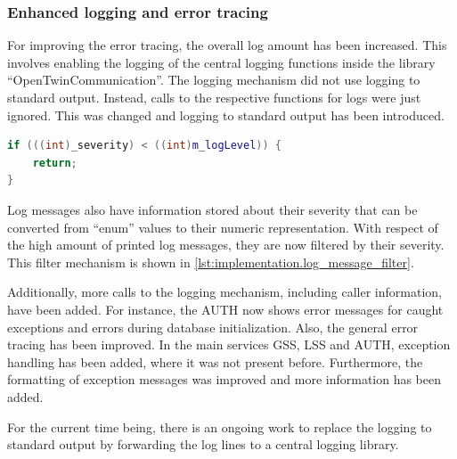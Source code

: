 \subsubsection*{Enhanced logging and error tracing}
For improving the error tracing, the overall log amount has been increased. This involves enabling the logging of the central logging functions inside the library \enquote{OpenTwinCommunication}. The logging mechanism did not use logging to standard output. Instead, calls to the respective functions for logs were just ignored. This was changed and logging to standard output has been introduced. 
\begin{lstlisting}[label=lst:implementation.log_message_filter, caption={Comparison of the set log level with the log severity of the message. If the converted log severity is less than the defined log level, the message is ignored. (\textit{/Libraries/OpenTwinCommunication/src/ServiceLogger.cpp})}, language=c++, firstnumber=60]
if (((int)_severity) < ((int)m_logLevel)) {
	return;
}
\end{lstlisting}
Log messages also have information stored about their severity that can be converted from \enquote{enum} values to their numeric representation. With respect of the high amount of printed log messages, they are now filtered by their severity. This filter mechanism is shown in \autoref{lst:implementation.log_message_filter}.

Additionally, more calls to the logging mechanism, including caller information, have been added. For instance, the \ac{AUTH} now shows error messages for caught exceptions and errors during database initialization.
Also, the general error tracing has been improved. In the main services \ac{GSS}, \ac{LSS} and \ac{AUTH}, exception handling has been added, where it was not present before. Furthermore, the formatting of exception messages was improved and more information has been added.

For the current time being, there is an ongoing work to replace the logging to standard output by forwarding the log lines to a central logging library.

